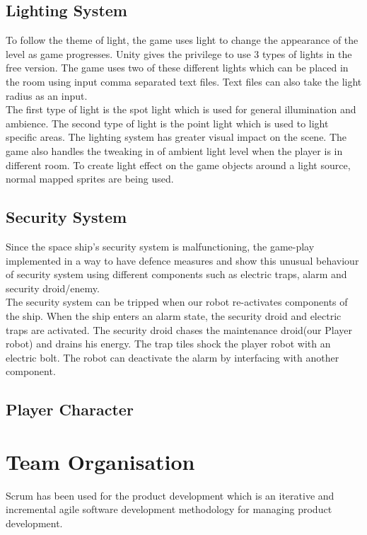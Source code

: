 \documentclass[11pt]{article}
\begin{document}
\subsection{Lighting System}
To follow the theme of light, the game uses light to change the appearance of the level as game progresses. Unity gives the privilege to use 3 types of lights in the free version. The game uses two of these different lights which can be placed in the room using input comma separated text files. Text files can also take the light radius as an input.\\

The first type of light is the spot light which is used for general illumination and ambience. The second type of light is the point light which is used to light specific areas. The lighting system has greater visual impact on the scene. The game also handles the tweaking in of ambient light level when the player is in different room. To create light effect on the game objects around a light source, normal mapped sprites are being used.
\subsection{Security System}
Since the space ship's security system is malfunctioning, the game-play implemented in a way to have defence measures and show this unusual behaviour of security system using different components such as  electric traps, alarm and security droid/enemy.\\

The security system can be tripped when our robot re-activates components of the ship. When the ship enters an alarm state, the security droid and electric traps are activated. The security droid chases the maintenance droid(our Player robot) and drains his energy. The trap tiles shock the player robot with an electric bolt. The robot can deactivate the alarm by interfacing with another component.
\subsection{Player Character}
\section{Team Organisation}
Scrum has been used for the product development which is an iterative and incremental agile software development methodology for managing product development.\\
\end{document}
